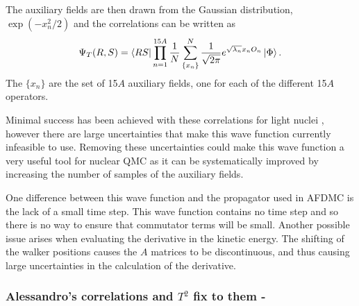 The auxiliary fields are then drawn from the Gaussian distribution, $\exp\left(-x_n^2/2\right)$ and the correlations can be written as
\begin{equation}
   \Psi_T(R,S) = \left< RS \right|\prod\limits_{n=1}^{15A} \frac{1}{N} \sum\limits_{\{x_n\}}^N\frac{1}{\sqrt{2\pi}}e^{\sqrt{\lambda_n}x_nO_n}\left| \Phi \right>.
\end{equation}
The $\{x_n\}$ are the set of 15$A$ auxiliary fields, one for each of the different 15$A$ operators.

Minimal success has been achieved with these correlations for light nuclei \cite{bouadani2009_dissertation}, however there are large uncertainties that make this wave function currently infeasible to use. Removing these uncertainties could make this wave function a very useful tool for nuclear QMC as it can be systematically improved by increasing the number of samples of the auxiliary fields.

One difference between this wave function and the propagator used in AFDMC is the lack of a small time step. This wave function contains no time step and so there is no way to ensure that commutator terms will be small. Another possible issue arises when evaluating the derivative in the kinetic energy. The shifting of the walker positions causes the $A$ matrices to be discontinuous, and thus causing large uncertainties in the calculation of the derivative.

\subsubsection{Alessandro's correlations and $T^2$ fix to them - }
